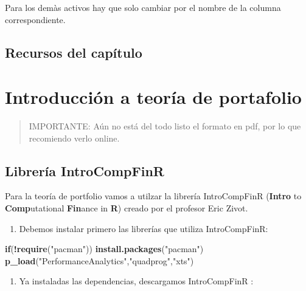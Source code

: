 \documentclass[12pt,]{book}
\newenvironment{Shaded}{\begin{snugshade}}{\end{snugshade}}
\newcommand{\KeywordTok}[1]{\textcolor[rgb]{0.13,0.29,0.53}{\textbf{#1}}}
\newcommand{\StringTok}[1]{\textcolor[rgb]{0.31,0.60,0.02}{#1}}
\newcommand{\ControlFlowTok}[1]{\textcolor[rgb]{0.13,0.29,0.53}{\textbf{#1}}}
\newcommand{\OperatorTok}[1]{\textcolor[rgb]{0.81,0.36,0.00}{\textbf{#1}}}
\newcommand{\NormalTok}[1]{#1}
\providecommand{\tightlist}{%
  \setlength{\itemsep}{0pt}\setlength{\parskip}{0pt}}
\begin{document}
Para los demàs activos hay que solo cambiar por el nombre de la columna
correspondiente.

\section{Recursos del capítulo}\label{recursos-del-capitulo}

\chapter{Introducción a teoría de portafolio}\label{portafolio}

\begin{quote}
IMPORTANTE: Aún no está del todo listo el formato en pdf, por lo que
recomiendo verlo online.
\end{quote}

\section{Librería IntroCompFinR}\label{libreria-introcompfinr}

Para la teoría de portfolio vamos a utilzar la librería IntroCompFinR
(\textbf{Intro} to \textbf{Comp}utational \textbf{Fin}ance in
\textbf{R}) creado por el profesor Eric Zivot.

\begin{enumerate}
\def\labelenumi{\arabic{enumi}.}
\tightlist
\item
  Debemos instalar primero las librerías que utiliza IntroCompFinR:
\end{enumerate}

\begin{Shaded}
\begin{Highlighting}[]
\ControlFlowTok{if}\NormalTok{(}\OperatorTok{!}\KeywordTok{require}\NormalTok{(}\StringTok{"pacman"}\NormalTok{)) }\KeywordTok{install.packages}\NormalTok{(}\StringTok{"pacman"}\NormalTok{)}
\KeywordTok{p_load}\NormalTok{(}\StringTok{"PerformanceAnalytics"}\NormalTok{,}\StringTok{"quadprog"}\NormalTok{,}\StringTok{"xts"}\NormalTok{)}
\end{Highlighting}
\end{Shaded}

\begin{enumerate}
\def\labelenumi{\arabic{enumi}.}
\setcounter{enumi}{1}
\tightlist
\item
  Ya instaladas las dependencias, descargamos IntroCompFinR :
\end{enumerate}
\end{document}
